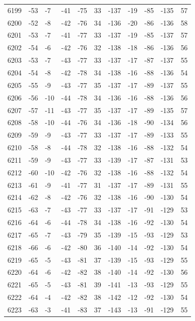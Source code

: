 \begin{table}[H]
\begin{tabular}{lllllllllll}
6199 & -53 & -7 & -41 & -75 & 33 & -137 & -19 & -85 & -135 & 57 \\
6200 & -52 & -8 & -42 & -76 & 34 & -136 & -20 & -86 & -136 & 58 \\
6201 & -53 & -7 & -41 & -77 & 33 & -137 & -19 & -85 & -137 & 57 \\
6202 & -54 & -6 & -42 & -76 & 32 & -138 & -18 & -86 & -136 & 56 \\
6203 & -53 & -7 & -43 & -77 & 33 & -137 & -17 & -87 & -137 & 55 \\
6204 & -54 & -8 & -42 & -78 & 34 & -138 & -16 & -88 & -136 & 54 \\
6205 & -55 & -9 & -43 & -77 & 35 & -137 & -17 & -89 & -137 & 55 \\
6206 & -56 & -10 & -44 & -78 & 34 & -136 & -16 & -88 & -136 & 56 \\
6207 & -57 & -11 & -43 & -77 & 35 & -137 & -17 & -89 & -135 & 57 \\
6208 & -58 & -10 & -44 & -76 & 34 & -136 & -18 & -90 & -134 & 56 \\
6209 & -59 & -9 & -43 & -77 & 33 & -137 & -17 & -89 & -133 & 55 \\
6210 & -58 & -8 & -44 & -78 & 32 & -138 & -16 & -88 & -132 & 54 \\
6211 & -59 & -9 & -43 & -77 & 33 & -139 & -17 & -87 & -131 & 53 \\
6212 & -60 & -10 & -42 & -76 & 32 & -138 & -16 & -88 & -132 & 54 \\
6213 & -61 & -9 & -41 & -77 & 31 & -137 & -17 & -89 & -131 & 55 \\
6214 & -62 & -8 & -42 & -76 & 32 & -138 & -16 & -90 & -130 & 54 \\
6215 & -63 & -7 & -43 & -77 & 33 & -137 & -17 & -91 & -129 & 53 \\
6216 & -64 & -6 & -44 & -78 & 34 & -138 & -16 & -92 & -130 & 54 \\
6217 & -65 & -7 & -43 & -79 & 35 & -139 & -15 & -93 & -129 & 53 \\
6218 & -66 & -6 & -42 & -80 & 36 & -140 & -14 & -92 & -130 & 54 \\
6219 & -65 & -5 & -43 & -81 & 37 & -139 & -15 & -93 & -129 & 55 \\
6220 & -64 & -6 & -42 & -82 & 38 & -140 & -14 & -92 & -130 & 56 \\
6221 & -65 & -5 & -43 & -81 & 39 & -141 & -13 & -93 & -129 & 55 \\
6222 & -64 & -4 & -42 & -82 & 38 & -142 & -12 & -92 & -130 & 54 \\
6223 & -63 & -3 & -41 & -83 & 37 & -143 & -13 & -91 & -129 & 55 \\

\end{tabular}
\end{table}
